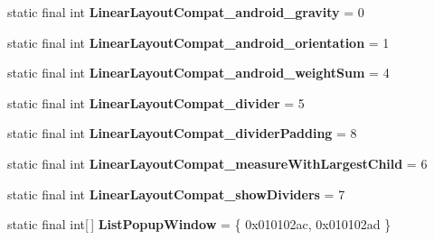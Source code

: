 \begin{DoxyCompactItemize}
\item 
\hypertarget{classandroid_1_1support_1_1design_1_1_r_1_1styleable_a94fd5dcf64b530191f4c13699d3f209c}{}static final int {\bfseries Linear\+Layout\+Compat\+\_\+android\+\_\+gravity} = 0\label{classandroid_1_1support_1_1design_1_1_r_1_1styleable_a94fd5dcf64b530191f4c13699d3f209c}

\item 
\hypertarget{classandroid_1_1support_1_1design_1_1_r_1_1styleable_ac3216c909a53d0d655295199b5db8bcc}{}static final int {\bfseries Linear\+Layout\+Compat\+\_\+android\+\_\+orientation} = 1\label{classandroid_1_1support_1_1design_1_1_r_1_1styleable_ac3216c909a53d0d655295199b5db8bcc}

\item 
\hypertarget{classandroid_1_1support_1_1design_1_1_r_1_1styleable_a318f80ff51afeb9607da24e1f3cd602d}{}static final int {\bfseries Linear\+Layout\+Compat\+\_\+android\+\_\+weight\+Sum} = 4\label{classandroid_1_1support_1_1design_1_1_r_1_1styleable_a318f80ff51afeb9607da24e1f3cd602d}

\item 
\hypertarget{classandroid_1_1support_1_1design_1_1_r_1_1styleable_ac8f9cf041955a4a03a7828e19e0b5d6d}{}static final int {\bfseries Linear\+Layout\+Compat\+\_\+divider} = 5\label{classandroid_1_1support_1_1design_1_1_r_1_1styleable_ac8f9cf041955a4a03a7828e19e0b5d6d}

\item 
\hypertarget{classandroid_1_1support_1_1design_1_1_r_1_1styleable_aefe5390da1fa3772f1cabab70d820ada}{}static final int {\bfseries Linear\+Layout\+Compat\+\_\+divider\+Padding} = 8\label{classandroid_1_1support_1_1design_1_1_r_1_1styleable_aefe5390da1fa3772f1cabab70d820ada}

\item 
\hypertarget{classandroid_1_1support_1_1design_1_1_r_1_1styleable_ad27424b27e6cc866d087f59f8e75e3d6}{}static final int {\bfseries Linear\+Layout\+Compat\+\_\+measure\+With\+Largest\+Child} = 6\label{classandroid_1_1support_1_1design_1_1_r_1_1styleable_ad27424b27e6cc866d087f59f8e75e3d6}

\item 
\hypertarget{classandroid_1_1support_1_1design_1_1_r_1_1styleable_aef434d8f11ec28d28dd7fe7371c2b39e}{}static final int {\bfseries Linear\+Layout\+Compat\+\_\+show\+Dividers} = 7\label{classandroid_1_1support_1_1design_1_1_r_1_1styleable_aef434d8f11ec28d28dd7fe7371c2b39e}

\item 
\hypertarget{classandroid_1_1support_1_1design_1_1_r_1_1styleable_a90ef2283a7dff64bc22eed53a9aa1a73}{}static final int\mbox{[}$\,$\mbox{]} {\bfseries List\+Popup\+Window} = \{ 0x010102ac, 0x010102ad \}\label{classandroid_1_1support_1_1design_1_1_r_1_1styleable_a90ef2283a7dff64bc22eed53a9aa1a73}


\end{DoxyCompactItemize}
